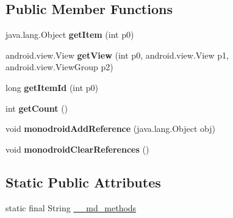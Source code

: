 \subsection*{Public Member Functions}
\begin{DoxyCompactItemize}
\item 
\mbox{\label{classmd5b60ffeb829f638581ab2bb9b1a7f4f3f_1_1NavigationMenuRenderer__MenuAdapter_a3cb8fab254be843c50be7d6e6e705d1c}} 
java.\+lang.\+Object {\bfseries get\+Item} (int p0)
\item 
\mbox{\label{classmd5b60ffeb829f638581ab2bb9b1a7f4f3f_1_1NavigationMenuRenderer__MenuAdapter_aa621b4dceee4ef8f0c60b60b62206b5a}} 
android.\+view.\+View {\bfseries get\+View} (int p0, android.\+view.\+View p1, android.\+view.\+View\+Group p2)
\item 
\mbox{\label{classmd5b60ffeb829f638581ab2bb9b1a7f4f3f_1_1NavigationMenuRenderer__MenuAdapter_a97604532182d2b563da571e93f4470d2}} 
long {\bfseries get\+Item\+Id} (int p0)
\item 
\mbox{\label{classmd5b60ffeb829f638581ab2bb9b1a7f4f3f_1_1NavigationMenuRenderer__MenuAdapter_a8d535563c8612033ca9ed9f3f7c61aae}} 
int {\bfseries get\+Count} ()
\item 
\mbox{\label{classmd5b60ffeb829f638581ab2bb9b1a7f4f3f_1_1NavigationMenuRenderer__MenuAdapter_a9bf9b83d132d02411f1545779c1151c0}} 
void {\bfseries monodroid\+Add\+Reference} (java.\+lang.\+Object obj)
\item 
\mbox{\label{classmd5b60ffeb829f638581ab2bb9b1a7f4f3f_1_1NavigationMenuRenderer__MenuAdapter_a94f3e1fc8dc319bcb897648b1c681949}} 
void {\bfseries monodroid\+Clear\+References} ()
\end{DoxyCompactItemize}
\subsection*{Static Public Attributes}
\begin{DoxyCompactItemize}
\item 
static final String \hyperlink{classmd5b60ffeb829f638581ab2bb9b1a7f4f3f_1_1NavigationMenuRenderer__MenuAdapter_a09a523e0422c5d80d38ab17bbf6fe89b}{\+\_\+\+\_\+md\+\_\+methods}
\end{DoxyCompactItemize}

